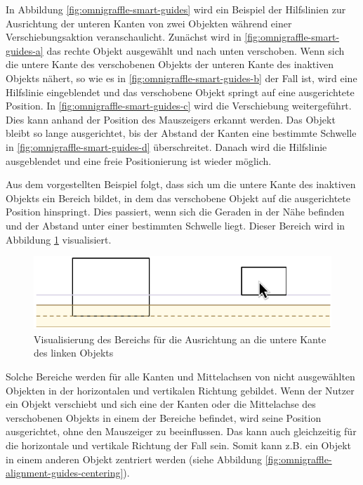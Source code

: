 In Abbildung \ref{fig:omnigraffle-smart-guides} wird ein Beispiel der Hilfslinien zur Ausrichtung der unteren Kanten von zwei Objekten während einer Verschiebungsaktion veranschaulicht. Zunächst wird in \ref{fig:omnigraffle-smart-guides-a} das rechte Objekt ausgewählt und nach unten verschoben. Wenn sich die untere Kante des verschobenen Objekts der unteren Kante des inaktiven Objekts nähert, so wie es in \ref{fig:omnigraffle-smart-guides-b} der Fall ist, wird eine Hilfslinie eingeblendet und das verschobene Objekt springt auf eine ausgerichtete Position. In \ref{fig:omnigraffle-smart-guides-c} wird die Verschiebung weitergeführt. Dies kann anhand der Position des Mauszeigers erkannt werden. Das Objekt bleibt so lange ausgerichtet, bis der Abstand der Kanten eine bestimmte Schwelle in \ref{fig:omnigraffle-smart-guides-d} überschreitet. Danach wird die Hilfslinie ausgeblendet und eine freie Positionierung ist wieder möglich.

Aus dem vorgestellten Beispiel folgt, dass sich um die untere Kante des inaktiven Objekts ein Bereich bildet, in dem das verschobene Objekt auf die ausgerichtete Position hinspringt. Dies passiert, wenn sich die Geraden in der Nähe befinden und der Abstand unter einer bestimmten Schwelle liegt. Dieser Bereich wird in Abbildung \ref{fig:omnigraffle-smart-guides-snap-area} visualisiert.

\begin{figure}[hbt]
    \centering
    \includegraphics{assets/omnigraffle-smart-guides-snap-area}
    \caption{Visualisierung des Bereichs für die Ausrichtung an die untere Kante des linken Objekts}
    \label{fig:omnigraffle-smart-guides-snap-area}
\end{figure}

Solche Bereiche werden für alle Kanten und Mittelachsen von nicht ausgewählten Objekten in der horizontalen und vertikalen Richtung gebildet. Wenn der Nutzer ein Objekt verschiebt und sich eine der Kanten oder die Mittelachse des verschobenen Objekts in einem der Bereiche befindet, wird seine Position ausgerichtet, ohne den Mauszeiger zu beeinflussen. Das kann auch gleichzeitig für die horizontale und vertikale Richtung der Fall sein. Somit kann z.B. ein Objekt in einem anderen Objekt zentriert werden (siehe Abbildung \ref{fig:omnigraffle-alignment-guides-centering}).

